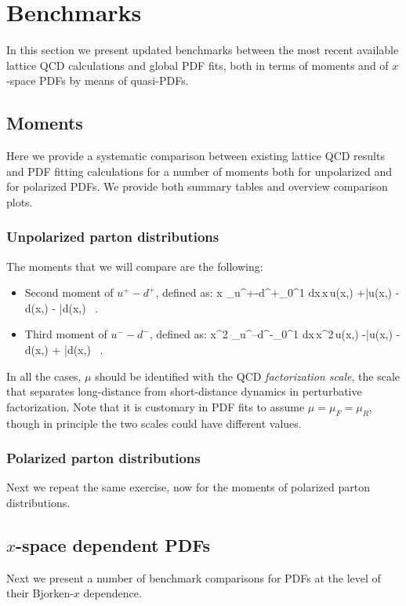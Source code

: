 \section{Benchmarks}

In this section we present updated benchmarks between the most
recent available lattice QCD calculations and global PDF fits,
both in terms of moments and of $x$-space PDFs by means of
quasi-PDFs.

\subsection{Moments}

Here we provide a systematic comparison between existing
lattice QCD results and PDF fitting calculations
for a number of moments both for unpolarized
and for polarized PDFs.
%
We provide both summary tables and overview comparison plots.

\subsubsection{Unpolarized parton distributions}

The moments that we will compare are the following:

\begin{itemize}

\item Second moment of $u^+-d^+$, defined as:
  \be
  \la x \ra_{u^+-d^+}\equiv \int_0^1 dx\,x\,\lc u(x,\mu)
  +\bar{u}(x,\mu)
-d(x,\mu) - \bar{d}(x,\mu) \, .
  \rc
  \ee

\item Third moment of $u^--d^-$, defined as:
  \be
  \la x^2 \ra_{u^--d^-}\equiv \int_0^1 dx\,x^2\,\lc u(x,\mu)
  -\bar{u}(x,\mu)
-d(x,\mu) + \bar{d}(x,\mu) \, .
  \rc
  \ee

  \end{itemize}

In all the cases, $\mu$ should be identified with the QCD
{\it factorization scale}, the scale that separates
long-distance from short-distance dynamics in perturbative
factorization.
%
Note that it is customary in PDF fits to assume
$\mu=\mu_F=\mu_R$, though in principle the two scales
could have different values.

\subsubsection{Polarized parton distributions}

Next we repeat the same exercise, now for the moments
of polarized parton distributions.


\subsection{$x$-space dependent PDFs}

Next we present a number of benchmark comparisons for
PDFs at the level of their Bjorken-$x$
dependence.
